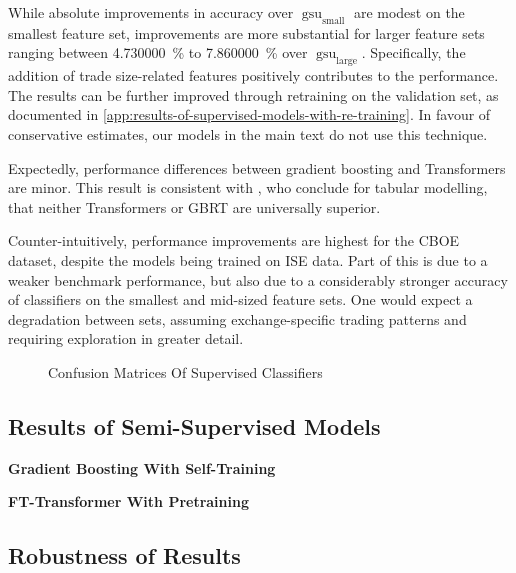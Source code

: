 While absolute improvements in accuracy over $\operatorname{gsu}_{\mathrm{small}}$ are modest on the smallest feature set, improvements are more substantial for larger feature sets ranging between \SI{4.730000}{\percent} to \SI{7.860000}{\percent} over $\operatorname{gsu}_{\mathrm{large}}$. Specifically, the addition of trade size-related features positively contributes to the performance. The results can be further improved through retraining on the validation set, as documented in \cref{app:results-of-supervised-models-with-re-training}. In favour of conservative estimates, our models in the main text do not use this technique.

Expectedly, performance differences between gradient boosting and Transformers are minor. This result is consistent with \textcites{grinsztajnWhyTreebasedModels2022}{gorishniyRevisitingDeepLearning2021}, who conclude for tabular modelling, that neither Transformers or \gls{GBRT} are universally superior. 

Counter-intuitively, performance improvements are highest for the \gls{CBOE} dataset, despite the models being trained on \gls{ISE} data. Part of this is due to a weaker benchmark performance, but also due to a considerably stronger accuracy of classifiers on the smallest and mid-sized feature sets. One would expect a degradation between sets, assuming exchange-specific trading patterns and requiring exploration in greater detail.

\begin{figure}[!h]
    \vfill
    \caption[]{Confusion Matrices Of Supervised Classifiers}
    \label{fig:confusion-matrix-supervised-ise-cboe}
\end{figure}

\subsection{Results of Semi-Supervised
    Models}\label{sec:results-of-semi-supervised-models}



\textbf{Gradient Boosting With Self-Training}

\textbf{FT-Transformer With Pretraining}

\subsection{Robustness of Results}\label{sec:robustness-checks}


